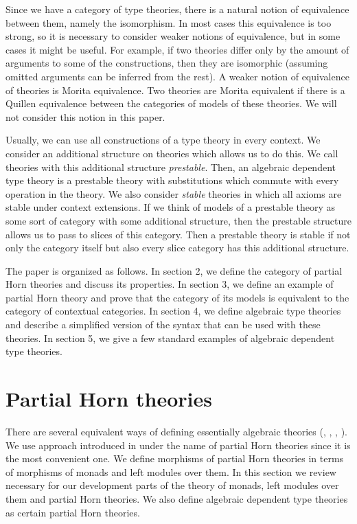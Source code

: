 \documentclass[reqno]{amsart}
\theoremstyle{definition}
\theoremstyle{remark}
\numberwithin{figure}{section}
\begin{document}
Since we have a category of type theories, there is a natural notion of equivalence between them, namely the isomorphism.
In most cases this equivalence is too strong, so it is necessary to consider weaker notions of equivalence, but in some cases it might be useful.
For example, if two theories differ only by the amount of arguments to some of the constructions,
then they are isomorphic (assuming omitted arguments can be inferred from the rest).
A weaker notion of equivalence of theories is Morita equivalence.
Two theories are Morita equivalent if there is a Quillen equivalence between the categories of models of these theories.
We will not consider this notion in this paper.

Usually, we can use all constructions of a type theory in every context.
We consider an additional structure on theories which allows us to do this.
We call theories with this additional structure \emph{prestable}.
Then, an algebraic dependent type theory is a prestable theory with substitutions which commute with every operation in the theory.
We also consider \emph{stable} theories in which all axioms are stable under context extensions.
If we think of models of a prestable theory as some sort of category with some additional structure,
then the prestable structure allows us to pass to slices of this category.
Then a prestable theory is stable if not only the category itself but also every slice category has this additional structure.

The paper is organized as follows.
In section 2, we define the category of partial Horn theories and discuss its properties.
In section 3, we define an example of partial Horn theory and prove that the category of its models is equivalent to the category of contextual categories.
In section 4, we define algebraic type theories and describe a simplified version of the syntax that can be used with these theories.
In section 5, we give a few standard examples of algebraic dependent type theories.

\section{Partial Horn theories}
\label{sec:PHT}

There are several equivalent ways of defining essentially algebraic theories (\cite{LPC}, \cite{GAT}, \cite{PHL}, \cite[D 1.3.4]{elephant}).
We use approach introduced in \cite{PHL} under the name of partial Horn theories since it is the most convenient one.
We define morphisms of partial Horn theories in terms of morphisms of monads and left modules over them.
In this section we review necessary for our development parts of the theory of monads, left modules over them and partial Horn theories.
We also define algebraic dependent type theories as certain partial Horn theories.
\end{document}
